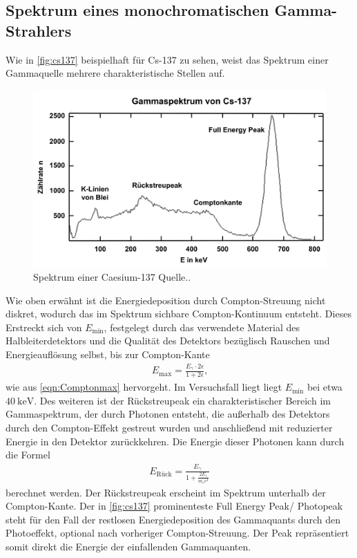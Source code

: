 \subsection{Spektrum eines monochromatischen Gamma-Strahlers}
Wie in \autoref{fig:cs137} beispielhaft für Cs-137 zu sehen, weist das Spektrum einer Gammaquelle mehrere charakteristische Stellen auf.
\begin{figure}[H]
  \centering
  \includegraphics[scale=0.3]{Ressourcen/cs137.png}
  \caption{Spektrum einer Caesium-137 Quelle.\cite{leifics137}.}
  \label{fig:cs137}
\end{figure}
Wie oben erwähnt ist die Energiedeposition durch Compton-Streuung nicht diskret, wodurch das im Spektrum sichbare Compton-Kontinuum entsteht. Dieses Erstreckt sich von $E_\text{min}$, festgelegt durch das verwendete Material des Halbleiterdetektors und die Qualität des Detektors bezüglisch Rauschen und Energieauflösung selbst, bis zur Compton-Kante
\begin{align} 
  E_\text{max}=\frac{E_\gamma\cdot2\epsilon}{1+2\epsilon}\text{,}\label{eqn:Emax}
\end{align}
wie aus \autoref{eqn:Comptonmax} hervorgeht. Im Versuchsfall liegt liegt $E_\text{min}$ bei etwa $\SI{40}{\kilo\eV}$.
Des weiteren ist der Rückstreupeak ein charakteristischer Bereich im Gammaspektrum, der durch Photonen entsteht, die außerhalb des Detektors durch den Compton-Effekt gestreut wurden und anschließend mit reduzierter Energie in den Detektor zurückkehren. Die Energie dieser Photonen kann durch die Formel
\begin{align} 
E_{\text{Rück}} = \frac{E_\gamma}{1 + \frac{2E_\gamma}{m_e c^2}}\label{eqn:Eback}
\end{align}
berechnet werden. Der Rückstreupeak erscheint im Spektrum unterhalb der Compton-Kante.
Der in \autoref{fig:cs137} prominenteste Full Energy Peak/ Photopeak steht für den Fall der restlosen Energiedeposition des Gammaquants durch den Photoeffekt, optional nach vorheriger Compton-Streuung. Der Peak repräsentiert somit direkt die Energie der einfallenden Gammaquanten. 